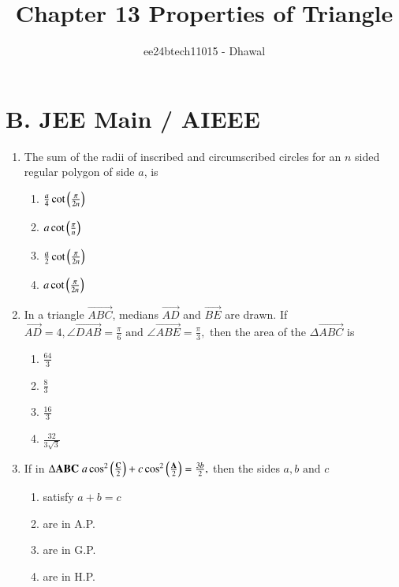 \documentclass[journal]{IEEEtran}
\theoremstyle{remark}
\begin{document}

\onecolumn

\title{Chapter 13 Properties of Triangle}
\author{ee24btech11015 - Dhawal}
\maketitle

\renewcommand{\thefigure}{\theenumi}
\renewcommand{\thetable}{\theenumi}

\section*{B. JEE Main / AIEEE}
\begin{enumerate}[start=3]
        \item The sum of the radii of inscribed and circumscribed circles for an $n$ sided regular polygon of side $a$, is \hfill{}
\begin{multicols}{4}
\begin{enumerate}
        \item $\frac{a}{4} \cot{\ensuremath{\left(\frac{\pi}{2n}\right)}}$         
        \item $ a \cot{\ensuremath{\left(\frac{\pi}{n}\right)}}$ 
        \item $\frac{a}{2} \cot{\ensuremath{\left(\frac{\pi}{2n}\right)}}$ 
        \item $ a \cot{\ensuremath{\left(\frac{\pi}{2n}\right)}}$
\end{enumerate}
\end{multicols}

\item In a triangle $\vec{ABC}$, medians $\vec{AD}$ and $\vec{BE}$ are drawn. If $\vec{AD}=4,\angle{\vec{DAB}}=\frac{\pi}{6} \text{ and } \angle{\vec{ABE}}=\frac{\pi}{3},$ then the area of the $\Delta{\vec{ABC}}$ is \hfill{}
\begin{multicols}{4}
\begin{enumerate}
        \item $\frac{64}{3}$                    
        \item $\frac{8}{3}$ 
        \item $\frac{16}{3}$ 
        \item $\frac{32}{3\sqrt{3}}$
\end{enumerate}
\end{multicols} 

\item If in $\Delta{\mathbf{ABC}}\;a\cos^2\left(\frac{\mathbf{C}}{2}\right) + c\cos^2\left(\frac{\mathbf{A}}{2}\right) = \frac{3b}{2},$ then the sides $a,b\text{ and }c$ \hfill{}
\begin{multicols}{4}
\begin{enumerate}
        \item satisfy $a+b=c$                    
        \item are in A.P. 
        \item are in G.P. 
        \item are in H.P.
\end{enumerate}
\end{multicols} 


\end{enumerate}
\end{document}
